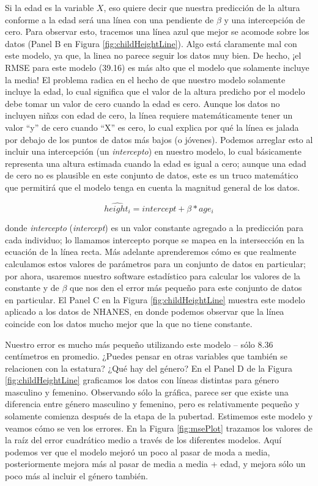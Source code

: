 \documentclass[
  12pt,
]{book}
\begin{document}
Si la edad es la variable \(X\), eso quiere decir que nuestra predicción de la altura conforme a la edad será una línea con una pendiente de \(\beta\) y una intercepción de cero. Para observar esto, tracemos una línea azul que mejor se acomode sobre los datos (Panel B en Figura \ref{fig:childHeightLine}). Algo está claramente mal con este modelo, ya que, la linea no parece seguir los datos muy bien. De hecho, ¡el RMSE para este modelo (39.16) es más alto que el modelo que solamente incluye la media! El problema radica en el hecho de que nuestro modelo solamente incluye la edad, lo cual significa que el valor de la altura predicho por el modelo debe tomar un valor de cero cuando la edad es cero. Aunque los datos no incluyen niñxs con edad de cero, la línea requiere matemáticamente tener un valor ``y'' de cero cuando ``X'' es cero, lo cual explica por qué la línea es jalada por debajo de los puntos de datos más bajos (o jóvenes). Podemos arreglar esto al incluir una intercepción (un \emph{intercepto}) en nuestro modelo, lo cual básicamente representa una altura estimada cuando la edad es igual a cero; aunque una edad de cero no es plausible en este conjunto de datos, este es un truco matemático que permitirá que el modelo tenga en cuenta la magnitud general de los datos.

\[
\hat{height_i} = intercept + \beta * age_i
\]

donde \emph{intercepto} (\emph{intercept}) es un valor constante agregado a la predicción para cada individuo; lo llamamos intercepto porque se mapea en la intersección en la ecuación de la línea recta. Más adelante aprenderemos cómo es que realmente calculamos estos valores de parámetros para un conjunto de datos en particular; por ahora, usaremos nuestro software estadístico para calcular los valores de la constante y de \(\beta\) que nos den el error más pequeño para este conjunto de datos en particular. El Panel C en la Figura \ref{fig:childHeightLine} muestra este modelo aplicado a los datos de NHANES, en donde podemos observar que la línea coincide con los datos mucho mejor que la que no tiene constante.

Nuestro error es mucho más pequeño utilizando este modelo -- sólo 8.36 centímetros en promedio. ¿Puedes pensar en otras variables que también se relacionen con la estatura? ¿Qué hay del género? En el Panel D de la Figura \ref{fig:childHeightLine} graficamos los datos con líneas distintas para género masculino y femenino. Observando sólo la gráfica, parece ser que existe una diferencia entre género masculino y femenino, pero es relativamente pequeño y solamente comienza después de la etapa de la pubertad. Estimemos este modelo y veamos cómo se ven los errores. En la Figura \ref{fig:msePlot} trazamos los valores de la raíz del error cuadrático medio a través de los diferentes modelos. Aquí podemos ver que el modelo mejoró un poco al pasar de moda a media, posteriormente mejora más al pasar de media a media + edad, y mejora sólo un poco más al incluir el género también.
\end{document}
